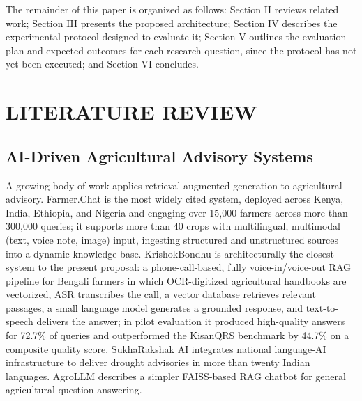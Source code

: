 \documentclass[conference]{IEEEtran}
\begin{document}
The remainder of this paper is organized as follows: Section II reviews related work; Section III presents the proposed architecture; Section IV describes the experimental protocol designed to evaluate it; Section V outlines the evaluation plan and expected outcomes for each research question, since the protocol has not yet been executed; and Section VI concludes.

\section{LITERATURE REVIEW}


\subsection{AI-Driven Agricultural Advisory Systems}

A growing body of work applies retrieval-augmented generation to agricultural advisory. Farmer.Chat \cite{farmerchat2024} is the most widely cited system, deployed across Kenya, India, Ethiopia, and Nigeria and engaging over 15,000 farmers across more than 300,000 queries; it supports more than 40 crops with multilingual, multimodal (text, voice note, image) input, ingesting structured and unstructured sources into a dynamic knowledge base. KrishokBondhu \cite{ameen2026krishokbondhu} is architecturally the closest system to the present proposal: a phone-call-based, fully voice-in/voice-out RAG pipeline for Bengali farmers in which OCR-digitized agricultural handbooks are vectorized, ASR transcribes the call, a vector database retrieves relevant passages, a small language model generates a grounded response, and text-to-speech delivers the answer; in pilot evaluation it produced high-quality answers for 72.7\% of queries and outperformed the KisanQRS benchmark \cite{rehman2023kisanqrs} by 44.7\% on a composite quality score. SukhaRakshak AI \cite{iwmi2025sukharakshak} integrates national language-AI infrastructure to deliver drought advisories in more than twenty Indian languages. AgroLLM \cite{agrollm2025} describes a simpler FAISS-based RAG chatbot for general agricultural question answering.
\end{document}
